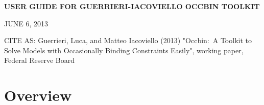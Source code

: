 \documentclass[12pt]{article}
\begin{document}
\setcounter{secnumdepth}{-1}%

\renewcommand{\baselinestretch}{1.05}
\normalsize%

\begin{center}
\textbf{USER GUIDE FOR GUERRIERI-IACOVIELLO OCCBIN TOOLKIT}

JUNE 6, 2013
\end{center}

CITE AS: Guerrieri, Luca, and Matteo Iacoviello (2013) "Occbin:\ A Toolkit
to Solve Models with Occasionally Binding Constraints Easily", working
paper, Federal Reserve Board

\bigskip

\section{Overview}
\end{document}
